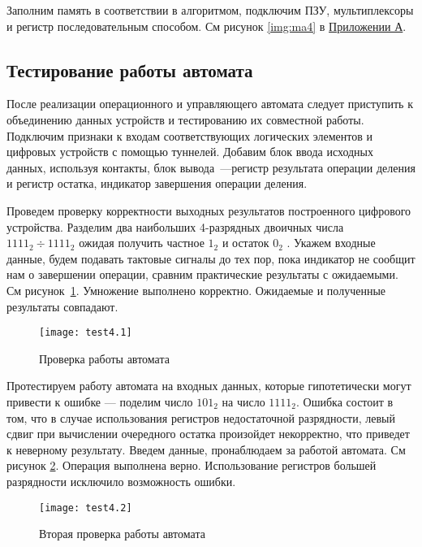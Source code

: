 \documentclass[a4paper,14pt]{extarticle}
\begin{document}
Заполним память в соответствии в алгоритмом, подключим ПЗУ, мультиплексоры и регистр последовательным способом. См рисунок \ref{img:ma4} в \hyperref[tam]{Приложении А}.


\subsection{Тестирование работы автомата}
После реализации операционного и управляющего автомата следует приступить к объединению данных устройств и тестированию их совместной работы. Подключим признаки к входам соответствующих логических элементов и цифровых устройств с помощью туннелей. Добавим блок ввода исходных данных, используя контакты, блок вывода~---регистр результата операции деления и регистр остатка, индикатор завершения операции деления.

Проведем проверку корректности выходных результатов построенного цифрового устройства. Разделим два наибольших 4-разрядных двоичных числа $1111_2 \div 1111_2$ ожидая получить частное $1_2$ и остаток $0_2$ . Укажем входные данные, будем подавать тактовые сигналы до тех пор, пока индикатор не сообщит нам о завершении операции, сравним практические результаты с ожидаемыми. См рисунок~\ref{img:test4.1}. Умножение выполнено корректно. Ожидаемые и полученные результаты совпадают.
\begin{figure}[h!]
	\centering
	\texttt{[image: test4.1]}
	\caption {Проверка работы автомата}
	\label{img:test4.1}
\end{figure}

Протестируем работу автомата на входных данных, которые гипотетически могут привести к ошибке --- поделим число $101_2$ на число $1111_2$. Ошибка состоит в том, что в случае использования регистров недостаточной разрядности, левый сдвиг при вычислении очередного остатка произойдет некорректно, что приведет к неверному результату. Введем данные, пронаблюдаем за работой автомата. См рисунок \ref{img:test4.2}. Операция выполнена верно. Использование регистров большей разрядности исключило возможность ошибки.
\begin{figure}[h!]
	\centering
	\texttt{[image: test4.2]}
	\caption {Вторая проверка работы автомата}
	\label{img:test4.2}
\end{figure}
\end{document}
